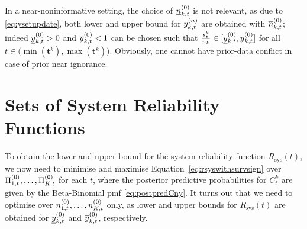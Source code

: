 \documentclass[12pt, a4paper]{elsarticle}
\newcommand{\bs}[1]{\boldsymbol{#1}}
\renewcommand{\vec}[1]{{\bs#1}}
\newcommand{\Rsys}{R_\text{sys}}
\newcommand{\td}[1]{%
  \iftoggle{td}{%
    \todo[inline]{#1}%
  }{}%
}
\begin{document}
%
In a near-noninformative setting, the choice of $\underline{n}^{(0)}_{k,t}$ is not relevant,
as due to \eqref{eq:ysetupdate}, both lower and upper bound for $y^{(n)}_{k,t}$ are obtained with $\overline{n}^{(0)}_{k,t}$; 
indeed $\underline{y}^{(0)}_{k,t} > 0$ and $\overline{y}^{(0)}_{k,t} < 1$ can be chosen such that
$\frac{s^k_t}{n_k} \in [\underline{y}^{(0)}_{k,t}, \overline{y}^{(0)}_{k,t}]$ for all $t \in \big(\min(\vec{t}^k), \max(\vec{t}^k)\big)$.
Obviously, one cannot have prior-data conflict in case of prior near ignorance.


\section{Sets of System Reliability Functions}
\label{sec:setsofrel}

To obtain the lower and upper bound for the system reliability function $\Rsys(t)$,
we now need to minimise and maximise Equation~\eqref{eq:rsyswithsurvsign} over $\Pi^{(0)}_{1,t}, \ldots, \Pi^{(0)}_{K,t}$ for each $t$,
where the posterior predictive probabilities for $C^k_t$ are given by the Beta-Binomial pmf \eqref{eq:postpredCny}.
It turns out that we need to optimise over $n^{(0)}_{1,t}, \ldots, n^{(0)}_{K,t}$ only, %
as lower and upper bounds for $\Rsys(t)$ are obtained for $\underline{y}^{(0)}_{k,t}$ and $\overline{y}^{(0)}_{k,t}$, respectively.
\end{document}
